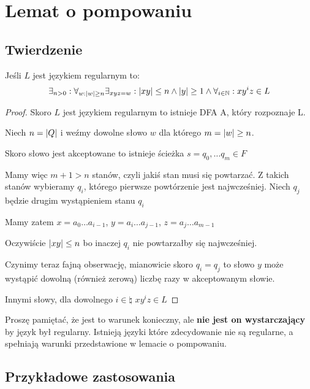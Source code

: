 \section{Lemat o pompowaniu} 

\subsection{Twierdzenie}

\begin{lemma}[O pompowaniu]
    Jeśli \( L \) jest językiem regularnym to:
    \[
        \exists_{n > 0} : \forall_{w : \left\lvert w\right\rvert \geq n} \exists_{xyz = w} : \left\lvert xy\right\rvert \leq n \land \left\lvert y\right\rvert \geq 1 \land \forall_{i \in \mathbb{N}} : xy^iz \in L
    \]
\end{lemma}
\begin{proof}
    Skoro \( L \) jest językiem regularnym to istnieje DFA A, który rozpoznaje L.
    
    Niech \( n = \left\lvert Q\right\rvert \) i weźmy dowolne słowo \( w \) dla którego \( m = \left\lvert w\right\rvert \geq n \).
    
    Skoro słowo jest akceptowane to istnieje ścieżka \( s = q_0, \dots q_m \in F \)
    
    Mamy więc \( m + 1 > n \) stanów, czyli jakiś stan musi się powtarzać. 
    Z takich stanów wybieramy \( q_i \), którego pierwsze powtórzenie jest najwcześniej. Niech \( q_j \) będzie drugim wystąpieniem stanu \( q_i \)
    
    Mamy zatem \( x = a_0\dots a_{i-1} \), \( y = a_i\dots a_{j-1} \), \( z = a_j \dots a_{m-1} \)
    
    Oczywiście \( \left\lvert xy\right\rvert \leq n \) bo inaczej \( q_i \) nie powtarzałby się najwcześniej.
    
    Czynimy teraz fajną obserwację, mianowicie skoro  \( q_i = q_j \) to słowo \( y \) może wystąpić dowolną (również zerową) liczbę razy w akceptowanym słowie.
    
    Innymi słowy, dla dowolnego \( i \in \natural \) \( xy^iz \in L \)
\end{proof}

Proszę pamiętać, że jest to warunek konieczny, ale \textbf{nie jest on wystarczający} by język był regularny. Istnieją języki które zdecydowanie nie są regularne, a spełniają warunki przedstawione w lemacie o pompowaniu. 

\subsection{Przykładowe zastosowania}

